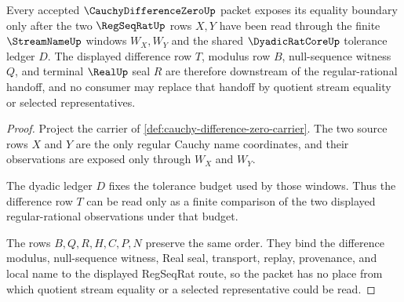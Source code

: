 \begin{theorem}
\label{thm:cauchy-difference-zero-regseqrat-handoff}
Every accepted $\CauchyDifferenceZeroUp$ packet exposes its equality boundary only after the two $\RegSeqRatUp$ rows $X,Y$ have been read through the finite $\StreamNameUp$ windows $W_X,W_Y$ and the shared $\DyadicRatCoreUp$ tolerance ledger $D$. The displayed difference row $T$, modulus row $B$, null-sequence witness $Q$, and terminal $\RealUp$ seal $R$ are therefore downstream of the regular-rational handoff, and no consumer may replace that handoff by quotient stream equality or selected representatives.
\end{theorem}
\begin{proof}
Project the carrier of \autoref{def:cauchy-difference-zero-carrier}. The two source rows $X$ and $Y$ are the only regular Cauchy name coordinates, and their observations are exposed only through $W_X$ and $W_Y$.

The dyadic ledger $D$ fixes the tolerance budget used by those windows. Thus the difference row $T$ can be read only as a finite comparison of the two displayed regular-rational observations under that budget.

The rows $B,Q,R,H,C,P,N$ preserve the same order. They bind the difference modulus, null-sequence witness, Real seal, transport, replay, provenance, and local name to the displayed RegSeqRat route, so the packet has no place from which quotient stream equality or a selected representative could be read.
\end{proof}

